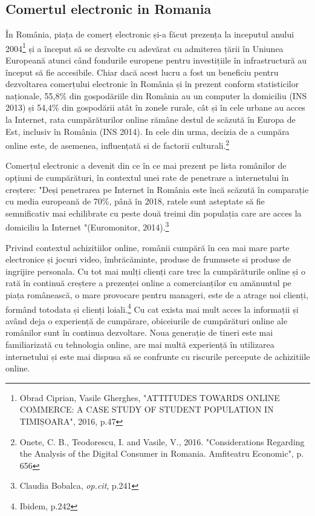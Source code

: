 \documentclass[a4paper, 12pt]{article}
\begin{document}
	\subsection{Comertul electronic in Romania}
	\qquad  În România, piața de comerț electronic și-a făcut prezența la inceputul anului 2004\footnote{Obrad Ciprian, Vasile Gherghes, "ATTITUDES TOWARDS ONLINE COMMERCE: A CASE STUDY OF STUDENT POPULATION IN TIMIȘOARA", 2016, p.47} și a început să se dezvolte cu adevărat cu admiterea țării în Uniunea Europeană atunci când fondurile europene pentru investițiile în infrastructură au început să fie accesibile. Chiar dacă acest lucru a fost un beneficiu pentru dezvoltarea comerțului electronic în România și în prezent conform statisticilor naționale, 55,8\% din gospodăriile din România au un computer la domiciliu (INS 2013) și 54,4\% din gospodării atât în zonele rurale, cât și în cele urbane au acces la Internet, rata cumpărăturilor online rămâne destul de scăzută în Europa de Est, inclusiv în România (INS 2014). In cele din urma, decizia de a cumpăra online este, de asemenea, influențată si de factorii culturali.\footnote{Onete, C. B., Teodorescu, I. and Vasile, V., 2016. "Considerations Regarding the Analysis of the Digital Consumer in Romania. Amfiteatru Economic", p. 656}
	
	\qquad Comerțul electronic a devenit din ce în ce mai prezent pe lista românilor de opțiuni de cumpărături, în contextul unei rate de penetrare a internetului în creștere: "Deși penetrarea pe Internet în România este încă scăzută în comparație cu media europeană de 70\%, până în 2018, ratele sunt asteptate să fie semnificativ mai echilibrate cu peste două treimi din populația care are acces la domiciliu la Internet "(Euromonitor, 2014).\footnote{Claudia Bobalca, \textit{op.cit}, p.241}
	
	\quad Privind contextul achizitiilor online, românii cumpără în cea mai mare parte electronice și jocuri video, îmbrăcăminte, produse de frumusete si produse de ingrijire personala. Cu tot mai mulți clienți care trec la cumpărăturile online și o rată în continuă creștere a prezenței online a comercianților cu amănuntul pe piața românească, o mare provocare pentru manageri, este de a atrage noi clienți, formând  totodata și clienți loiali.\footnote{Ibidem, p.242} Cu cat exista mai mult acces la informații și având deja o experiență de cumpărare, obiceiurile de cumpărături online ale românilor sunt în continua dezvoltare. Noua generație de tineri este mai familiarizată cu tehnologia online, are mai multă experiență în utilizarea internetului și este mai dispusa să se confrunte cu riscurile percepute de achizitiile online.
	
\end{document}
